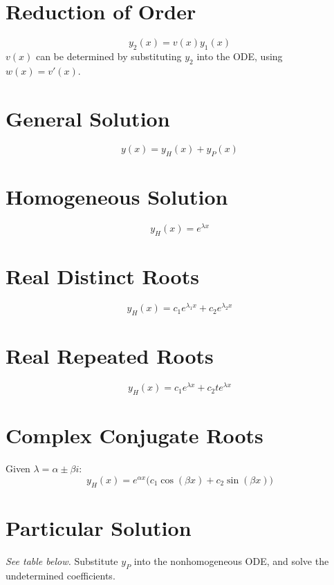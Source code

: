 \documentclass{article}
\begin{document}
\begin{multicols}{3}
    \section*{Reduction of Order}
    \begin{equation*}
        y_2\left( x \right) = v\left(x\right) y_1\left( x \right)
    \end{equation*}
    \(v\left( x \right)\) can be determined by substituting \(y_2\) into the ODE, using \(w\left( x \right) = v'\left( x \right)\).
    \section*{General Solution}
    \begin{equation*}
        y\left( x \right) = y_H\left( x \right) + y_P\left( x \right)
    \end{equation*}
    \section*{Homogeneous Solution}
    \begin{equation*}
        y_H\left( x \right) = e^{\lambda x}
    \end{equation*}
    \section*{Real Distinct Roots}
    \begin{equation*}
        y_H\left( x \right) = c_1e^{\lambda_1 x} + c_2e^{\lambda_2 x}
    \end{equation*}
    \section*{Real Repeated Roots}
    \begin{equation*}
        y_H\left( x \right) = c_1e^{\lambda x} + c_2 te^{\lambda x}
    \end{equation*}
    \section*{Complex Conjugate Roots}
    Given \(\lambda = \alpha \pm \beta i\):
    \begin{equation*}
        y_H\left( x \right) = e^{\alpha x}\bigl( c_1\cos{\left( \beta x \right)} + c_2 \sin{\left( \beta x \right)} \bigr)
    \end{equation*}
    \section*{Particular Solution}
    \emph{See table below.}
    Substitute \(y_P\) into the nonhomogeneous ODE, and solve the undetermined coefficients.

\end{multicols}
\end{document}
